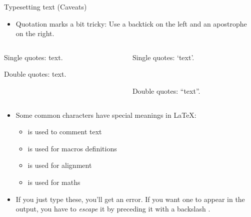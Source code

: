 \documentclass[,aspectratio=43]{beamer}
\newenvironment{Shaded}{\begin{snugshade}}{\end{snugshade}}
\newcommand{\NormalTok}[1]{#1}
\providecommand{\tightlist}{%
  \setlength{\itemsep}{0pt}\setlength{\parskip}{0pt}}
\begin{document}
\begin{frame}[fragile]{Typesetting text (Caveats)}
\protect\hypertarget{typesetting-text-caveats}{}
\begin{itemize}
\tightlist
\item
  Quotation marks a bit tricky: Use a backtick  on
  the left and an apostrophe  on the right.
\end{itemize}

\begin{columns}[T]
\begin{column}{0.48\textwidth}
\vspace{-1em}

\begin{Shaded}
\begin{Highlighting}[]
\NormalTok{Single quotes: \textasciigrave{}text\textquotesingle{}.}

\NormalTok{Double quotes: \textasciigrave{}\textasciigrave{}text\textquotesingle{}\textquotesingle{}.}
\end{Highlighting}
\end{Shaded}
\end{column}

\begin{column}{0.48\textwidth}
Single quotes: `text'.

~

Double quotes: ``text''.
\end{column}
\end{columns}

\vspace{0.5em}

\begin{itemize}
\item
  Some common characters have special meanings in \LaTeX :

  \begin{itemize}
  \tightlist
  \item
    \framebox{\texttt{\%}} is used to comment text
  \item
    \framebox{\texttt{\#}} is used for macros definitions
  \item
    \framebox{\texttt{\&}} is used for alignment
  \item
    \framebox{\texttt{\$}} is used for maths
  \end{itemize}
\item
  If you just type these, you'll get an error. If you want one to appear
  in the output, you have to \emph{escape} it by preceding it with a
  backslash \framebox{\texttt{\textbackslash}}.
\end{itemize}


\end{frame}
\end{document}
